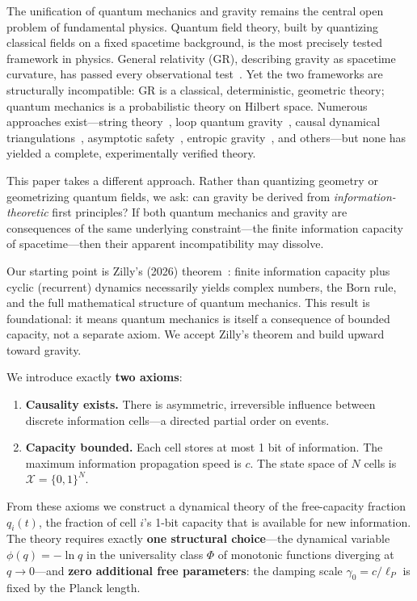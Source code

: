 \documentclass[aps,prd,twocolumn,showpacs,superscriptaddress,preprintnumbers]{revtex4-2}
\begin{document}
The unification of quantum mechanics and gravity remains the central open problem of fundamental physics.
Quantum field theory, built by quantizing classical fields on a fixed spacetime background, is the most precisely tested framework in physics.
General relativity (GR), describing gravity as spacetime curvature, has passed every observational test~\cite{Will:2014}.
Yet the two frameworks are structurally incompatible: GR is a classical, deterministic, geometric theory; quantum mechanics is a probabilistic theory on Hilbert space.
Numerous approaches exist---string theory~\cite{Green:1987sp,Polchinski:1998rq}, loop quantum gravity~\cite{Rovelli:2004tv,Ashtekar:2004eh}, causal dynamical triangulations~\cite{Ambjorn:2001cv}, asymptotic safety~\cite{Weinberg:1979,Reuter:2012}, entropic gravity~\cite{Verlinde:2010hp,Jacobson:1995ab}, and others---but none has yielded a complete, experimentally verified theory.

This paper takes a different approach.
Rather than quantizing geometry or geometrizing quantum fields, we ask: can gravity be derived from \emph{information-theoretic} first principles?
If both quantum mechanics and gravity are consequences of the same underlying constraint---the finite information capacity of spacetime---then their apparent incompatibility may dissolve.

Our starting point is Zilly's (2026) theorem~\cite{Zilly:2026}: finite information capacity plus cyclic (recurrent) dynamics necessarily yields complex numbers, the Born rule, and the full mathematical structure of quantum mechanics.
This result is foundational: it means quantum mechanics is itself a consequence of bounded capacity, not a separate axiom.
We accept Zilly's theorem and build upward toward gravity.

We introduce exactly \textbf{two axioms}:

\begin{enumerate}
    \item[A1.] \textbf{Causality exists.} There is asymmetric, irreversible influence between discrete information cells---a directed partial order on events.
    \item[A2.] \textbf{Capacity bounded.} Each cell stores at most 1 bit of information. The maximum information propagation speed is $c$. The state space of $N$ cells is $\mathcal{X}=\{0,1\}^N$.
\end{enumerate}

From these axioms we construct a dynamical theory of the free-capacity fraction $q_i(t)$, the fraction of cell $i$'s 1-bit capacity that is available for new information.
The theory requires exactly \textbf{one structural choice}---the dynamical variable $\phi(q)=-\ln q$ in the universality class $\Phi$ of monotonic functions diverging at $q\to0$---and \textbf{zero additional free parameters}: the damping scale $\gamma_0=c/\ell_P$ is fixed by the Planck length.
\end{document}

